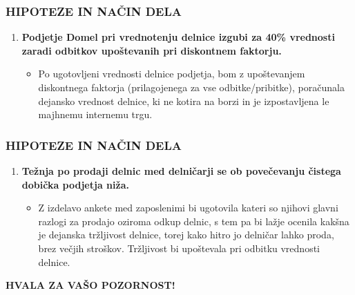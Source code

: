 \documentclass{beamer}
\begin{document}
\begin{frame}
\frametitle{HIPOTEZE IN NAČIN DELA}
\begin{enumerate}
\item \textbf{Podjetje Domel pri vrednotenju delnice izgubi za 40\% vrednosti zaradi odbitkov upoštevanih pri diskontnem faktorju.}
\begin{itemize}
\item Po ugotovljeni vrednosti delnice podjetja, bom z upoštevanjem diskontnega faktorja (prilagojenega za vse odbitke/pribitke), poračunala dejansko vrednost delnice, ki ne kotira na borzi in je izpostavljena le majhnemu internemu trgu.
\end{itemize}
\end{enumerate}
\end{frame}


\begin{frame}
\frametitle{HIPOTEZE IN NAČIN DELA}
\begin{enumerate}[2]
\item \textbf{Težnja po prodaji delnic med delničarji se ob povečevanju čistega dobička podjetja niža.}
\begin{itemize}
\item Z izdelavo ankete med zaposlenimi bi ugotovila kateri so njihovi glavni razlogi za prodajo oziroma odkup delnic, s tem pa bi lažje ocenila kakšna je dejanska tržljivost delnice, torej kako hitro jo delničar lahko proda, brez večjih stroškov. Tržljivost bi upoštevala pri odbitku vrednosti delnice.
\end{itemize}
\end{enumerate}
\end{frame}

\begin{frame}
\begin{center}
\textbf{HVALA ZA VAŠO POZORNOST!}
\end{center}
\end{frame}
\end{document}
